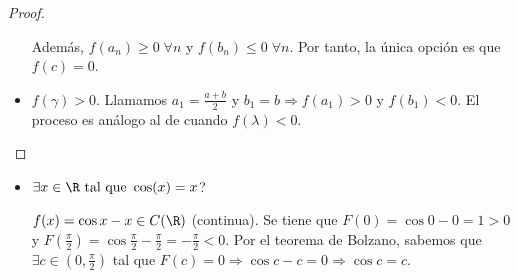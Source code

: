 \begin{proof}
\begin{itemize}
		      Además, \(f(a_n) \geq 0 \; \forall n \) y \(f(b_n ) \leq 0 \;\forall n \). Por tanto, la única opción es que \(f(c) = 0 \).
		\item \(f(\gamma ) > 0 \). Llamamos \(a_1 = \frac{a+ b }{2} \) y \(b_1 = b \Rightarrow f(a_1) > 0\) y \(f(b_1) < 0 \). El proceso es análogo al de cuando \(f(\lambda) < 0 \).
	\end{itemize}
\end{proof}

\begin{example}
	\begin{itemize}
		\item \(\exists x \in \R \text{ tal que } \cos (x ) = x \)?
		      
		      \(f(x) = \cos x - x \in C(\R )\) (continua). Se tiene que
		      \(F(0) = \cos 0  - 0 = 1 > 0\) y \(F(\frac{\pi}{2}) = \cos \frac{\pi}{2} - \frac{\pi}{2} = - \frac{\pi}{2} < 0 \). Por el teorema de Bolzano, sabemos que \(\exists c \in (0, \frac{\pi}{2})\) tal que \(F(c) = 0 \Rightarrow \cos c - c = 0 \Rightarrow \cos  c = c \).
		      
	\end{itemize}
\end{example}
